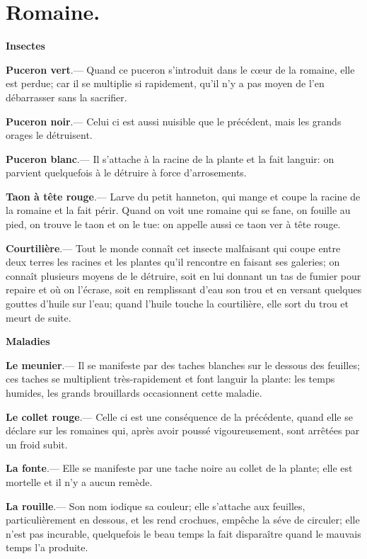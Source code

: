 \documentclass[10pt,a4paper]{book}
\begin{document}
\section{Romaine.}

\textbf{Insectes}

\textbf{Puceron vert}.--- Quand ce puceron s'introduit dans le cœur de la romaine, elle est perdue; car il se multiplie si rapidement, qu'il n'y a pas moyen de l'en débarrasser sans la sacrifier.

\textbf{Puceron noir}.--- Celui ci est aussi nuisible que le précédent, mais les grands orages le détruisent.

\textbf{Puceron blanc}.--- Il s'attache à la racine de la plante et la fait languir: on parvient quelquefois à le détruire à force d'arrosements.

\textbf{Taon à tête rouge}.--- Larve du petit hanneton, qui mange et coupe la racine de la romaine et la fait périr. Quand on voit une romaine qui se fane, on fouille au pied, on trouve le taon et on le tue: on appelle aussi ce taon ver à tête rouge.

\textbf{Courtilière}.--- Tout le monde connaît cet insecte malfaisant qui coupe entre deux terres les racines et les plantes qu'il rencontre en faisant ses galeries; on connaît plusieurs moyens de le détruire, soit en lui donnant un tas de fumier pour repaire et où on l'écrase, soit en remplissant d'eau son trou et en versant quelques gouttes d'huile sur l'eau; quand l'huile touche la courtilière, elle sort du trou et meurt de suite.

\textbf{Maladies}

\textbf{Le meunier}.--- Il se manifeste par des taches blanches sur le dessous des feuilles; ces taches se multiplient très-rapidement et font languir la plante: les temps humides, les grands brouillards occasionnent cette maladie.

\textbf{Le collet rouge}.--- Celle ci est une conséquence de la précédente, quand elle se déclare sur les romaines qui, après avoir poussé vigoureusement, sont arrêtées par un froid subit.

\textbf{La fonte}.--- Elle se manifeste par une tache noire au collet de la plante; elle est mortelle et il n'y a aucun remède.

\textbf{La rouille}.--- Son nom iodique sa couleur; elle s'attache aux feuilles, particulièrement en dessous, et les rend crochues, empêche la séve de circuler; elle n'est pas incurable, quelquefois le beau temps la fait disparaître quand le mauvais temps l'a produite.
\end{document}
